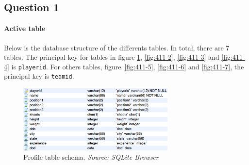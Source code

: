 
\subsection{Question 1}
\label{subsec:411}

\paragraph{Active table}


\paragraph{}


\paragraph{}Below is the database structure of the differents tables. In total, there are 7 tables. The principal key for tables in figure \ref{fig:411-1}, \ref{fig:411-2}, \ref{fig:411-3} and \ref{fig:411-4} is \texttt{playerid}. For others tables, figure~\ref{fig:411-5}, \ref{fig:411-6} and \ref{fig:411-7}, the principal key is \texttt{teamid}.

\begin{figure}[h!]
	\begin{center}
		\includegraphics[width=0.7\textwidth]{./images/profile}
		\caption{Profile table schema. \textit{Source: SQLite Browser}}
		\label{fig:411-1}
	\end{center}
\end{figure}

